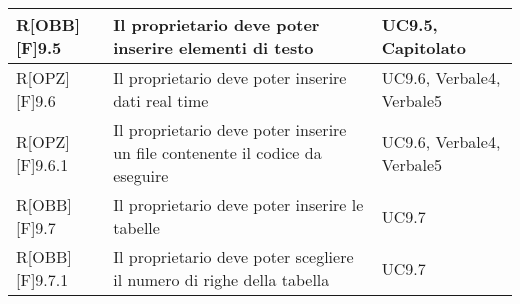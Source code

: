 \begin{table}[h]
\begin{tabular}{|p{}|p{}|p{}|}
R[OBB][F]9.5 & Il proprietario deve poter inserire elementi di testo & UC9.5, Capitolato \\ \midrule
R[OPZ][F]9.6 & Il proprietario deve poter inserire dati \gls{real time} & UC9.6, Verbale4, Verbale5 \\ \midrule
R[OPZ][F]9.6.1 & Il proprietario deve poter inserire un file contenente il codice da eseguire  & UC9.6, Verbale4, Verbale5 \\ \midrule
R[OBB][F]9.7 & Il proprietario deve poter inserire le tabelle & UC9.7 \\ \midrule
R[OBB][F]9.7.1 & Il proprietario deve poter scegliere il numero di righe della tabella & UC9.7 \\ \midrule

		\end{tabular}
	\end{table}
	\newpage
	
